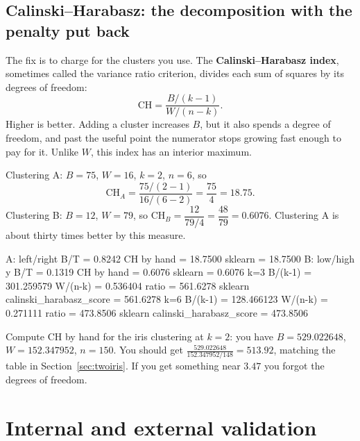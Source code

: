 \documentclass[11pt]{article}
\begin{document}
\subsection{Calinski--Harabasz: the decomposition with the penalty put back}
\label{sec:ch}

The fix is to charge for the clusters you use. The
\textbf{Calinski--Harabasz index}, sometimes called the variance ratio
criterion, divides each sum of squares by its degrees of freedom:
\begin{equation}
  \mathrm{CH} = \frac{B / (k-1)}{W / (n-k)} .
  \label{eq:ch}
\end{equation}
Higher is better. Adding a cluster increases $B$, but it also spends a degree
of freedom, and past the useful point the numerator stops growing fast enough
to pay for it. Unlike $W$, this index has an interior maximum.

\begin{worked}
Clustering A: $B = 75$, $W = 16$, $k = 2$, $n = 6$, so
\[
  \mathrm{CH}_A = \frac{75/(2-1)}{16/(6-2)} = \frac{75}{4} = \mathbf{18.75}.
\]
Clustering B: $B = 12$, $W = 79$, so
$\mathrm{CH}_B = \dfrac{12}{79/4} = \dfrac{48}{79} = \mathbf{0.6076}$.
Clustering A is about thirty times better by this measure.
\end{worked}

\begin{codeout}
A: left/right     B/T = 0.8242   CH by hand =  18.7500   sklearn =  18.7500
B: low/high y     B/T = 0.1319   CH by hand =   0.6076   sklearn =   0.6076
k=3  B/(k-1) = 301.259579   W/(n-k) =   0.536404   ratio =  561.6278
     sklearn calinski_harabasz_score = 561.6278
k=6  B/(k-1) = 128.466123   W/(n-k) =   0.271111   ratio =  473.8506
     sklearn calinski_harabasz_score = 473.8506
\end{codeout}

\begin{tryit}
Compute $\mathrm{CH}$ by hand for the iris clustering at $k = 2$: you have
$B = 529.022648$, $W = 152.347952$, $n = 150$. You should get
$\frac{529.022648}{152.347952/148} = 513.92$, matching the table in
Section~\ref{sec:twoiris}. If you get something near $3.47$ you forgot the
degrees of freedom.
\end{tryit}

\notesources{\AMLUnitVIISources}

\section{Internal and external validation}
\label{sec:valid}
\end{document}
